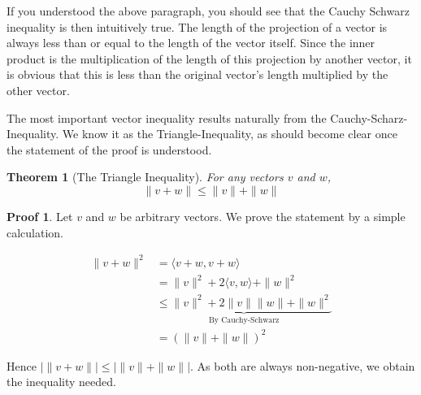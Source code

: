 \documentclass[12pt]{amsbook}
\theoremstyle{plain}
\newtheorem{theorem}{Theorem}
\theoremstyle{definition}
\newtheorem*{prf}{Proof}
\begin{document}
\begin{center}
\end{center}

If you understood the above paragraph, you should see that the Cauchy Schwarz inequality is then intuitively true. The length of the projection of a vector is always less than or equal to the length of the vector itself. Since the inner product is the multiplication of the length of this projection by another vector, it is obvious that this is less than the original vector's length multiplied by the other vector.

The most important vector inequality results naturally from the Cauchy-Scharz-Inequality. We know it as the Triangle-Inequality, as should become clear once the statement of the proof is understood.

\begin{theorem}[The Triangle Inequality]
  For any vectors $v$ and $w$,
  \[ \| v + w \| \leq \| v \| + \| w \| \]
\end{theorem}

\begin{prf}
  Let $v$ and $w$ be arbitrary vectors. We prove the statement by a simple calculation.

  \begin{align*}
    \| v + w \|^2 &= \langle v + w, v + w \rangle\\
                  &= \|v\|^2 + 2\langle v,w \rangle + \|w\|^2\\
                  &\underbrace{\leq \|v\|^2 + 2\|v\|\|w\| + \|w\|^2}_\text{By Cauchy-Schwarz}\\
                  &= (\|v\| + \|w\|)^2
  \end{align*}

  Hence $| \| v + w \| | \leq |\|v\| + \|w\| |$. As both are always non-negative, we obtain the inequality needed.
\end{prf}

\begin{center}
\end{center}
\end{document}
